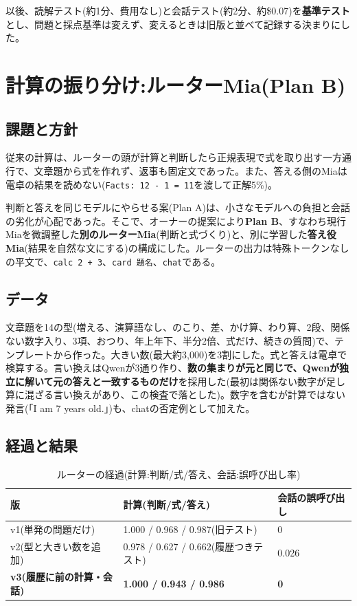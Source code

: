 \documentclass[a4paper,11pt]{article}
\begin{document}
以後、読解テスト(約1分、費用なし)と会話テスト(約2分、約\$0.07)を\textbf{基準テスト}とし、問題と採点基準は変えず、変えるときは旧版と並べて記録する決まりにした。

\section{計算の振り分け:ルーターMia(Plan B)}
\subsection{課題と方針}
従来の計算は、ルーターの頭が計算と判断したら正規表現で式を取り出す一方通行で、文章題から式を作れず、返事も固定文であった。また、答える側のMiaは電卓の結果を読めない(\texttt{Facts: 12 - 1 = 11}を渡して正解5\%)。

判断と答えを同じモデルにやらせる案(Plan A)は、小さなモデルへの負担と会話の劣化が心配であった。そこで、オーナーの提案により\textbf{Plan B}、すなわち現行Miaを微調整した\textbf{別のルーターMia}(判断と式づくり)と、別に学習した\textbf{答え役Mia}(結果を自然な文にする)の構成にした。ルーターの出力は特殊トークンなしの平文で、\texttt{calc 2 + 3}、\texttt{card 題名}、\texttt{chat}である。

\subsection{データ}
文章題を14の型(増える、演算語なし、のこり、差、かけ算、わり算、2段、関係ない数字入り、3項、おつり、年上年下、半分2倍、式だけ、続きの質問)で、テンプレートから作った。大きい数(最大約3,000)を3割にした。式と答えは電卓で検算する。言い換えはQwenが3通り作り、\textbf{数の集まりが元と同じで、Qwenが独立に解いて元の答えと一致するものだけ}を採用した(最初は関係ない数字が足し算に混ざる言い換えがあり、この検査で落とした)。数字を含むが計算ではない発言(「I am 7 years old.」)も、chatの否定例として加えた。

\subsection{経過と結果}
\begin{table}[H]\centering\small
\caption{ルーターの経過(計算:判断/式/答え、会話:誤呼び出し率)}\label{tab:router}
\begin{tabular}{lll}\toprule
版 & 計算(判断/式/答え) & 会話の誤呼び出し\\\midrule
v1(単発の問題だけ) & 1.000 / 0.968 / 0.987(旧テスト) & 0\\
v2(型と大きい数を追加) & 0.978 / 0.627 / 0.662(履歴つきテスト) & 0.026\\
\textbf{v3(履歴に前の計算・会話)} & \textbf{1.000 / 0.943 / 0.986} & \textbf{0}\\\bottomrule
\end{tabular}\end{table}
\end{document}

